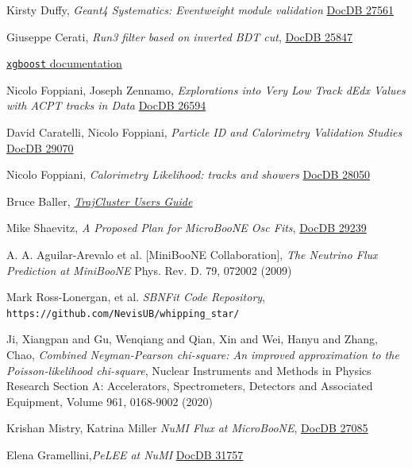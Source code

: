 \documentclass[a4paper]{article}
\begin{document}
\begin{thebibliography}{}
Kirsty Duffy, \emph{Geant4 Systematics: Eventweight module validation}
\href{https://microboone-docdb.fnal.gov/cgi-bin/private/ShowDocument?docid=27561}{DocDB 27561}

Giuseppe Cerati, \emph{Run3 filter based on inverted BDT cut}, \href{https://microboone-docdb.fnal.gov/cgi-bin/private/ShowDocument?docid=25847}{DocDB 25847}

\href{https://xgboost.readthedocs.io/}{\texttt{xgboost} documentation}

Nicolo Foppiani, Joseph Zennamo, \emph{Explorations into Very Low Track dEdx Values with ACPT tracks in Data}
\href{https://microboone-docdb.fnal.gov/cgi-bin/private/ShowDocument?docid=26594}{DocDB 26594}

David Caratelli, Nicolo Foppiani, \emph{Particle ID and Calorimetry Validation Studies}
\href{https://microboone-docdb.fnal.gov/cgi-bin/private/ShowDocument?docid=29070}{DocDB 29070}

Nicolo Foppiani, \emph{Calorimetry Likelihood: tracks and showers}
\href{https://microboone-docdb.fnal.gov/cgi-bin/private/ShowDocument?docid=28050}{DocDB 28050}

Bruce Baller,
\href{https://cdcvs.fnal.gov/redmine/attachments/download/49184/TrajCluster\%20Users\%20Guide.pdf}{\emph{TrajCluster Users Guide}}

Mike Shaevitz, \emph{A Proposed Plan for MicroBooNE Osc Fits}, \href{https://microboone-docdb.fnal.gov/cgi-bin/private/ShowDocument?docid=29239}{DocDB 29239}

A. A. Aguilar-Arevalo et al. [MiniBooNE Collaboration], \emph{The Neutrino Flux Prediction at MiniBooNE} Phys. Rev. D. 79, 072002 (2009)

Mark Ross-Lonergan, et al. \emph{SBNFit Code Repository}, \texttt{https://github.com/NevisUB/whipping\_star/}

Ji, Xiangpan and Gu, Wenqiang and Qian, Xin and Wei, Hanyu and Zhang, Chao, \emph{Combined Neyman-Pearson chi-square: An improved approximation to the Poisson-likelihood chi-square}, Nuclear Instruments and Methods in Physics Research Section A: Accelerators, Spectrometers, Detectors and Associated Equipment, Volume 961, 0168-9002 (2020)

Krishan Mistry, Katrina Miller \emph{NuMI Flux at MicroBooNE}, \href{https://microboone-docdb.fnal.gov/cgi-bin/private/ShowDocument?docid=27085}{DocDB 27085}


 Elena Gramellini,\emph{PeLEE at NuMI} \href{https://microboone-docdb.fnal.gov/cgi-bin/private/ShowDocument?docid=31757}{DocDB 31757}


\end{thebibliography}
\end{document}
